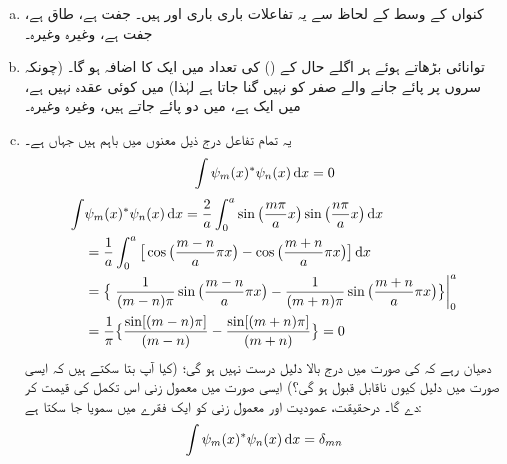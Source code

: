 \begin{enumerate}[a.]
\item
 کنواں کے وسط کے لحاظ سے یہ تفاعلات باری باری  اور  ہیں۔  جفت ہے،  طاق ہے،  جفت ہے، وغیرہ وغیرہ۔
\item
توانائی بڑھاتے ہوئے ہر اگلے حال کے  () کی تعداد میں ایک  کا اضافہ ہو گا۔ (چونکہ سروں پر پائے جانے والے صفر کو نہیں گنا جاتا ہے لہٰذا)  میں کوئی عقدہ نہیں ہے،  میں ایک ہے،  میں دو پائے جاتے ہیں، وغیرہ وغیرہ۔
\item
 یہ تمام تفاعل درج ذیل معنوں میں باہم  ہیں جہاں  ہے۔
\begin{align}
\int\psi_{m}(x)^*\psi_{n}(x)\dif{x}=0
\end{align}
\quad
\begin{align*}
\int&\psi_{m}(x)^*\psi_{n}(x)\dif{x}=\frac{2}{a}\int_{0}^{a}\sin\big(\frac{m\pi}{a}x\big)\sin\big(\frac{n\pi}{a}x\big)\dif{x}\\
&=\frac{1}{a}\int_{0}^{a}\big[\cos\big(\frac{m-n}{a}\pi x\big)-\cos\big(\frac{m+n}{a}\pi x\big)\big]\dif{x}\\
&=\big\{\left.\frac{1}{(m-n)\pi}\sin\big(\frac{m-n}{a}\pi x\big)-\frac{1}{(m+n)\pi}\sin\big(\frac{m+n}{a}\pi x\big)\big\}\right\vert_{0}^{a}\\
&=\frac{1}{\pi}\big\{\frac{\sin[(m-n)\pi]}{(m-n)}-\frac{\sin[(m+n)\pi]}{(m+n)}\big\}=0
\end{align*} 
دھیان رہے کہ  کی صورت میں درج بالا دلیل درست نہیں ہو گی؛ (کیا آپ بتا سکتے ہیں کہ ایسی صورت میں دلیل کیوں ناقابل قبول ہو گی؟) ایسی صورت میں معمول زنی اس تکمل کی قیمت  کر دے گا۔ درحقیقت، عمودیت اور معمول زنی کو ایک فقرے میں سمویا جا سکتا ہے:
\begin{align}
\int\psi_{m}(x)^*\psi_{n}(x)\dif{x}=\delta_{mn}
\end{align}

\end{enumerate}
